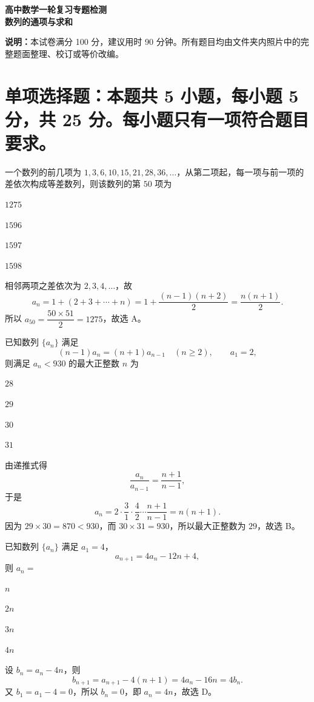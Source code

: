 

\begin{center}
  {\bfseries 高中数学一轮复习专题检测}\\[4pt]
  {\bfseries 数列的通项与求和}
\end{center}

\noindent\textbf{说明：}本试卷满分 100 分，建议用时 90 分钟。所有题目均由文件夹内照片中的完整题面整理、校订或等价改编。

\section{单项选择题：本题共 5 小题，每小题 5 分，共 25 分。每小题只有一项符合题目要求。}

\begin{question}[points=5]
一个数列的前几项为 $1,3,6,10,15,21,28,36,\ldots$，从第二项起，每一项与前一项的差依次构成等差数列，则该数列的第 $50$ 项为 \paren[A]
\begin{choices}
  \item $1275$
  \item $1596$
  \item $1597$
  \item $1598$
\end{choices}
\begin{solution}
相邻两项之差依次为 $2,3,4,\ldots$，故
\[
  a_n=1+(2+3+\cdots+n)=1+\frac{(n-1)(n+2)}2=\frac{n(n+1)}2.
\]
所以 $a_{50}=\dfrac{50\times51}{2}=1275$，故选 A。
\end{solution}
\end{question}

\begin{question}[points=5]
已知数列 $\{a_n\}$ 满足
\[
  (n-1)a_n=(n+1)a_{n-1}\quad(n\ge 2),\qquad a_1=2,
\]
则满足 $a_n<930$ 的最大正整数 $n$ 为 \paren[B]
\begin{choices}
  \item $28$
  \item $29$
  \item $30$
  \item $31$
\end{choices}
\begin{solution}
由递推式得
\[
 \frac{a_n}{a_{n-1}}=\frac{n+1}{n-1},
\]
于是
\[
 a_n=2\cdot\frac31\cdot\frac42\cdots\frac{n+1}{n-1}=n(n+1).
\]
因为 $29\times30=870<930$，而 $30\times31=930$，所以最大正整数为 $29$，故选 B。
\end{solution}
\end{question}

\begin{question}[points=5]
已知数列 $\{a_n\}$ 满足 $a_1=4$，
\[
 a_{n+1}=4a_n-12n+4,
\]
则 $a_n=$ \paren[D]
\begin{choices}
  \item $n$
  \item $2n$
  \item $3n$
  \item $4n$
\end{choices}
\begin{solution}
设 $b_n=a_n-4n$，则
\[
 b_{n+1}=a_{n+1}-4(n+1)=4a_n-16n=4b_n.
\]
又 $b_1=a_1-4=0$，所以 $b_n=0$，即 $a_n=4n$，故选 D。
\end{solution}
\end{question}

